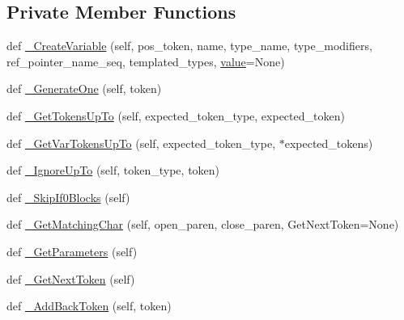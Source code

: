 \subsection*{Private Member Functions}
\begin{DoxyCompactItemize}
\item 
def \mbox{\hyperlink{classscripts_1_1generator_1_1cpp_1_1ast_1_1_ast_builder_a075c7e8ca813965fd502ba035e7dea78}{\+\_\+\+Create\+Variable}} (self, pos\+\_\+token, name, type\+\_\+name, type\+\_\+modifiers, ref\+\_\+pointer\+\_\+name\+\_\+seq, templated\+\_\+types, \mbox{\hyperlink{_obj__test_2lib_2googletest-master_2googlemock_2test_2gmock-matchers__test_8cc_a337b8a670efc0b086ad3af163f3121b6}{value}}=None)
\item 
def \mbox{\hyperlink{classscripts_1_1generator_1_1cpp_1_1ast_1_1_ast_builder_a0d9dd2f55e4607138a2526e9d4f07a2c}{\+\_\+\+Generate\+One}} (self, token)
\item 
def \mbox{\hyperlink{classscripts_1_1generator_1_1cpp_1_1ast_1_1_ast_builder_a51e8e396aaba96686055cf4b5d7c8966}{\+\_\+\+Get\+Tokens\+Up\+To}} (self, expected\+\_\+token\+\_\+type, expected\+\_\+token)
\item 
def \mbox{\hyperlink{classscripts_1_1generator_1_1cpp_1_1ast_1_1_ast_builder_a345d57d1b8a3026428bebd5f9caa0805}{\+\_\+\+Get\+Var\+Tokens\+Up\+To}} (self, expected\+\_\+token\+\_\+type, $\ast$expected\+\_\+tokens)
\item 
def \mbox{\hyperlink{classscripts_1_1generator_1_1cpp_1_1ast_1_1_ast_builder_af44dae0c6641156e3e880181d80fc857}{\+\_\+\+Ignore\+Up\+To}} (self, token\+\_\+type, token)
\item 
def \mbox{\hyperlink{classscripts_1_1generator_1_1cpp_1_1ast_1_1_ast_builder_a148c3539db03b5dc8ea20885425f06c6}{\+\_\+\+Skip\+If0\+Blocks}} (self)
\item 
def \mbox{\hyperlink{classscripts_1_1generator_1_1cpp_1_1ast_1_1_ast_builder_a8e701abef1e4f0f4c296bcba42c794e1}{\+\_\+\+Get\+Matching\+Char}} (self, open\+\_\+paren, close\+\_\+paren, Get\+Next\+Token=None)
\item 
def \mbox{\hyperlink{classscripts_1_1generator_1_1cpp_1_1ast_1_1_ast_builder_aee0d55c8d27b88dcd5b4fbea34e8bc9a}{\+\_\+\+Get\+Parameters}} (self)
\item 
def \mbox{\hyperlink{classscripts_1_1generator_1_1cpp_1_1ast_1_1_ast_builder_a141eba4114ec14d31e74ab4b41e740a5}{\+\_\+\+Get\+Next\+Token}} (self)
\item 
def \mbox{\hyperlink{classscripts_1_1generator_1_1cpp_1_1ast_1_1_ast_builder_ae2774011ba4632ead80dd9c2d9157c71}{\+\_\+\+Add\+Back\+Token}} (self, token)

\end{DoxyCompactItemize}
